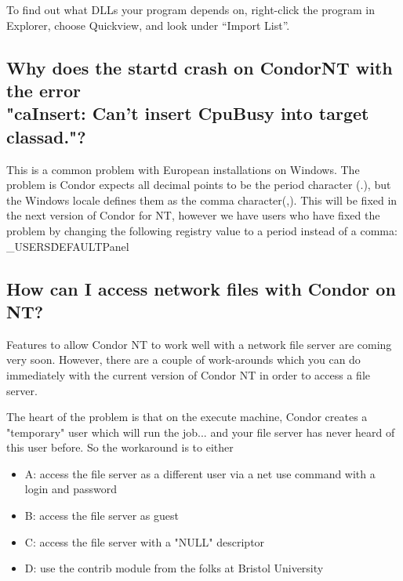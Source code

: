 To find out what DLLs your program depends on, right-click the program
in Explorer, choose Quickview, and look under ``Import List''.


\subsection*{Why does the startd crash on CondorNT with the error\\
"caInsert: Can't insert CpuBusy into target classad."?}

This is a common problem with European installations on Windows.
The problem is Condor expects all decimal points to be the
period character (.),
but the Windows locale defines them as the comma character(,).
This will be fixed in the next version of Condor for NT,
however we have users who have fixed the problem by 
changing the following registry value to a period instead of a comma:
\verb@HKEY_USERS\.DEFAULT\Control Panel\International\sDecimal@

\subsection*{How can I access network files with Condor on NT?}

Features to allow Condor NT to work well with a network file server are 
coming very soon.  However, there are a couple of work-arounds which you 
can do immediately with the current version of Condor NT in order to access 
a file server.

The heart of the problem is that on the execute machine, Condor creates a 
"temporary" user which will run the job... and your file server has never 
heard of this user before.  So the workaround is to either

\begin{itemize}
\item A: access the file server as a different user via a net use command with a 
login and password
\item B: access the file server as guest
\item C: access the file server with a "NULL" descriptor
\item D: use the contrib module from the folks at Bristol University
\end{itemize}

